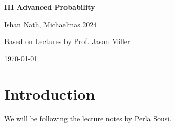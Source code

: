 \documentclass[12pt]{article}
\begin{document}
\hypersetup{pageanchor=false}
\begin{titlepage}
	\begin{center}
		\vspace*{1em}
		\Huge
		\textbf{III Advanced Probability}

		\vspace{1em}
		\large
		Ishan Nath, Michaelmas 2024

		\vspace{1.5em}

		\Large

		Based on Lectures by Prof. Jason Miller

		\vspace{1em}

		\large
		\today
	\end{center}
	
\end{titlepage}
\hypersetup{pageanchor=true}

\tableofcontents

\newpage


\setcounter{section}{-1}

\section{Introduction}%
\label{sec:intro}

We will be following the lecture notes by Perla Sousi.
\end{document}
